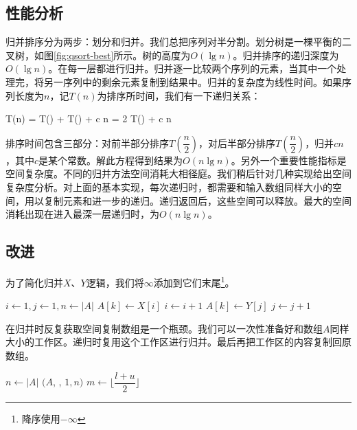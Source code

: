 \documentclass[b5paper]{ctexart}
\begin{document}
\subsection{性能分析}

归并排序分为两步：划分和归并。我们总把序列对半分割。划分树是一棵平衡的二叉树，如图\ref{fig:qsort-best}所示。树的高度为$O(\lg n)$。归并排序的递归深度为$O(\lg n)$。在每一层都进行归并。归并逐一比较两个序列的元素，当其中一个处理完，将另一序列中的剩余元素复制到结果中。归并的复杂度为线性时间。如果序列长度为$n$，记$T(n)$为排序所时间，我们有一下递归关系：

\be
T(n) = T() + T() + c n = 2 T() + c n
\ee

排序时间包含三部分：对前半部分排序$T(\dfrac{n}{2})$，对后半部分排序$T(\dfrac{n}{2})$，归并$c n$，其中$c$是某个常数。解此方程得到结果为$O(n \lg n)$。另外一个重要性能指标是空间复杂度。不同的归并方法空间消耗大相径庭。我们稍后针对几种实现给出空间复杂度分析。对上面的基本实现，每次递归时，都需要和输入数组同样大小的空间，用以复制元素和进一步的递归。递归返回后，这些空间可以释放。最大的空间消耗出现在进入最深一层递归时，为$O(n \lg n)$。

\subsection{改进}

为了简化归并$X$、$Y$逻辑，我们将$\infty$添加到它们末尾\footnote{降序使用$-\infty$}。

\begin{algorithmic}[1]
  \State {}
  \State {}
  \State $i \gets 1, j\gets 1, n \gets |A|$
      \State $A[k] \gets X[i]$
      \State $i \gets i + 1$
    \Else
      \State $A[k] \gets Y[j]$
      \State $j \gets j + 1$
    \EndIf
  \EndFor
\EndProcedure
\end{algorithmic}

在归并时反复获取空间复制数组是一个瓶颈\cite{Bentley}。我们可以一次性准备好和数组$A$同样大小的工作区。递归时复用这个工作区进行归并。最后再把工作区的内容复制回原数组。

\begin{algorithmic}[1]
  \State $n \gets |A|$
  \State {}$(A$, , $1, n)$
\EndProcedure
\Statex
{}
    \State $m \gets \lfloor \dfrac{l + u}{2} \rfloor$
    \State {}
    \State {}
    \State {}
  \EndIf
\EndProcedure
\end{algorithmic}
\end{document}
